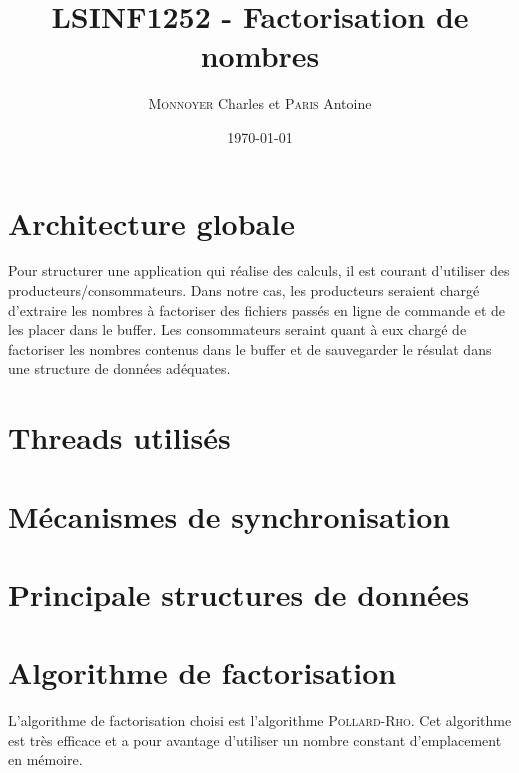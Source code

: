 \documentclass{scrartcl}
\title{LSINF1252 - Factorisation de nombres}
\author{\textsc{Monnoyer} Charles et \textsc{Paris} Antoine}
\date{\today}
\begin{document}
\maketitle

\section{Architecture globale}
Pour structurer une application qui réalise des calculs,
il est courant d'utiliser des producteurs/consommateurs\cite{syll}.
Dans notre cas, les producteurs seraient chargé d'extraire
les nombres à factoriser des fichiers passés en ligne
de commande et de les placer dans le buffer. Les
consommateurs seraint quant à eux chargé de factoriser
les nombres contenus dans le buffer et de sauvegarder
le résulat dans une structure de données adéquates. 

\section{Threads utilisés}

\section{Mécanismes de synchronisation}

\section{Principale structures de données}

\section{Algorithme de factorisation}
L'algorithme de factorisation choisi est l'algorithme
\textsc{Pollard-Rho}. Cet algorithme est très efficace
et a pour avantage d'utiliser un nombre constant
d'emplacement en mémoire\cite{algo}.



\end{document}
